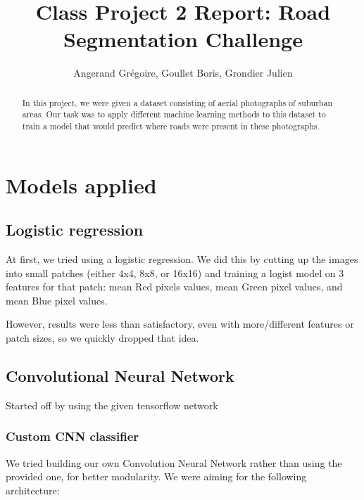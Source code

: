 \documentclass[11pt,conference,compsocconf]{IEEEtran}
\begin{document}
\title{Class Project 2 Report: Road Segmentation Challenge}

\author{
  Angerand Gr\'egoire, Goullet Boris, Grondier Julien 
}

\maketitle

\begin{abstract}
In this project, we were given a dataset consisting of aerial photographs of suburban areas. Our task was to apply different machine learning methods to this dataset to train a model that would predict where roads were present in these photographs.

\end{abstract}


\section{Models applied}

\subsection{Logistic regression}
At first, we tried using a logistic regression. We did this by cutting up the images into small patches (either 4x4, 8x8, or 16x16) and training a logist model on 3 features for that patch: mean Red pixels values, mean Green pixel values, and mean Blue pixel values.

However, results were less than satisfactory, even with more/different features or patch sizes, so we quickly dropped that idea.

\subsection{Convolutional Neural Network}
Started off by using the given tensorflow network

\subsubsection{Custom CNN classifier}
We tried building our own Convolution Neural Network rather than using the provided one, for better modularity. We were aiming for the following architecture: 
\end{document}

